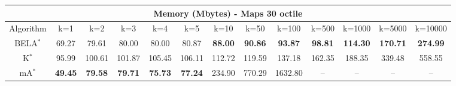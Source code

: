 \begin{tabular}{c|cccccccccccc}\toprule
\multicolumn{13}{c}{Memory (Mbytes) - Maps 30 octile}\\ \midrule
Algorithm & k=1 & k=2 & k=3 & k=4 & k=5 & k=10 & k=50 & k=100 & k=500 & k=1000 & k=5000 & k=10000 \\ \midrule
BELA$^*$ & 69.27 & 79.61 & 80.00 & 80.00 & 80.87 & \textbf{88.00} & \textbf{90.86} & \textbf{93.87} & \textbf{98.81} & \textbf{114.30} & \textbf{170.71} & \textbf{274.99} \\
K$^*$ & 95.99 & 100.61 & 101.87 & 105.45 & 106.11 & 112.72 & 119.59 & 137.18 & 162.35 & 188.35 & 339.48 & 558.55 \\
mA$^*$ & \textbf{49.45} & \textbf{79.58} & \textbf{79.71} & \textbf{75.73} & \textbf{77.24} & 234.90 & 770.29 & 1632.80 & -- & -- & -- & -- \\ \bottomrule 
\end{tabular}
